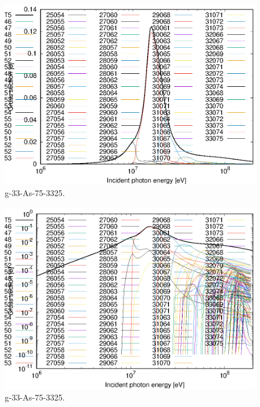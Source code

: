 \begin{figure}
 \includegraphics[width=\linewidth]{eps/g_33-As-75_3325.eps}
  \caption{g-33-As-75-3325.}
\end{figure}
\begin{figure}
 \includegraphics[width=\linewidth]{eps-log/g_33-As-75_3325.eps}
 \caption{g-33-As-75-3325.}
\end{figure}
\newpage \clearpage

